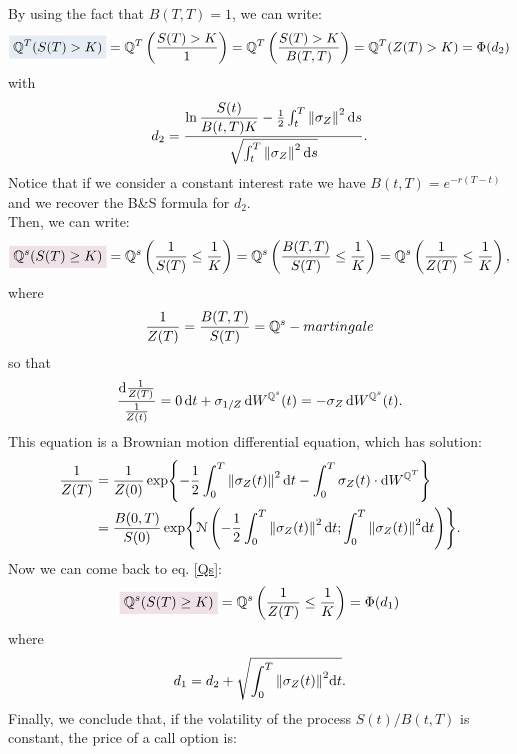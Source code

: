By using the fact that $B(T,T)=1$, we can write:
\begin{equation*}
    \hlc{mylightblue}{\Qmeas^T(S(T)> K)} = \Qmeas^T\left(\dfrac{S(T)> K}{1}\right) = \Qmeas^T\left(\dfrac{S(T)> K}{B(T,T)}\right) = \Qmeas^T(Z(T)> K) = \Phi(d_2)
\end{equation*}
with
\begin{equation}
    d_2 = \dfrac{\ln\dfrac{S(t)}{B(t,T)K}-\frac{1}{2}\int_t^T\norm{\sigma_Z}^2\,\dd s}{\sqrt{\int_t^T\norm{\sigma_Z}^2\,\dd s}}.
\end{equation}
Notice that if we consider a constant interest rate we have $B(t,T)=e^{-r(T-t)}$ and we recover the B\&S formula for $d_2$.\\ %
Then, we can write:
\begin{equation}\label{Qs}
    \hlc{mypink}{\Qmeas^s(S(T)\ge K)} = \Qmeas^s\left(\frac{1}{S(T)}\le\frac{1}{K}\right) = \Qmeas^s\left(\frac{B(T,T)}{S(T)}\le\frac{1}{K}\right) = \Qmeas^s\left(\frac{1}{Z(T)}\le\frac{1}{K}\right),
\end{equation}
where
\begin{equation}
    \frac{1}{Z(T)} = \frac{B(T,T)}{S(T)} = \mathbb{Q}^s-martingale
\end{equation}
so that
\begin{equation}
    \dfrac{\dd \frac{1}{Z(T)}}{\frac{1}{Z(t)}} = 0\,\dd t + \sigma_{1/Z}\,\dd W^{\Qmeas^s}(t) = -\sigma_Z \,\dd W^{\Qmeas^s}(t). %
\end{equation}
This equation is a Brownian motion differential equation, which has solution:
\begin{align}
    \frac{1}{Z(T)} &= \frac{1}{Z(0)}\exp{{-\frac{1}{2}\int_0^T\norm{\sigma_Z(t)}^2\,\dd t - \int_0^T\sigma_Z(t)\cdot\dd W^{\mathbb{Q}^T}}} \\
    &=
    \dfrac{B(0,T)}{S(0)}\exp{{\mathcal{N}\left(-\frac{1}{2}\int_0^T\norm{\sigma_Z(t)}^2\,\dd t; \int_0^T\norm{\sigma_Z(t)}^2\dd t\right)}}.
\end{align}
Now we can come back to eq. \eqref{Qs}:
\begin{equation}
    \hlc{mypink}{\Qmeas^s(S(T)\ge K)} = \Qmeas^s\left(\frac{1}{Z(T)}\le\frac{1}{K}\right) = \Phi(d_1)
\end{equation}
where
\begin{equation}
    d_1 = d_2 + \sqrt{\int_0^T\norm{\sigma_Z(t)}^2\dd t}.
\end{equation}
Finally, we conclude that, if the volatility of the process $S(t)/B(t,T)$ is constant, the price of a call option is:
